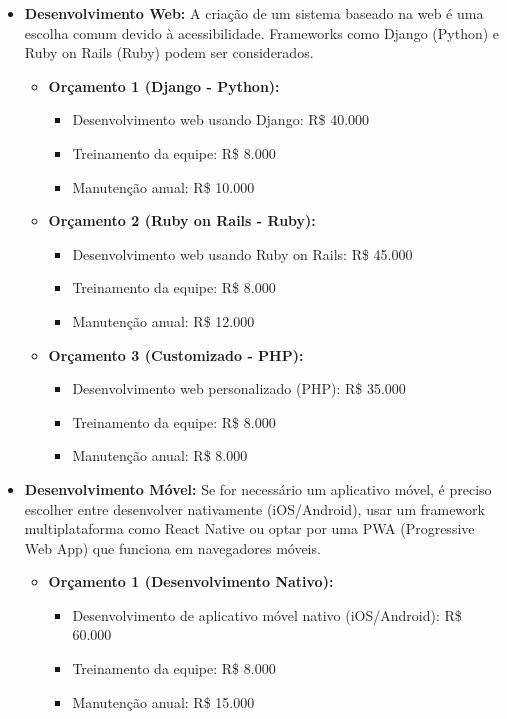 	\begin{itemize}
		\item \textbf{Desenvolvimento Web:} A criação de um sistema baseado na web é uma escolha comum devido à acessibilidade. Frameworks como Django (Python) e Ruby on Rails (Ruby) podem ser considerados.
		
		\begin{itemize}
			\item \textbf{Orçamento 1 (Django - Python):}
			\begin{itemize}
				\item Desenvolvimento web usando Django: R\$ 40.000
				\item Treinamento da equipe: R\$ 8.000
				\item Manutenção anual: R\$ 10.000
			\end{itemize}
			
			\item \textbf{Orçamento 2 (Ruby on Rails - Ruby):}
			\begin{itemize}
				\item Desenvolvimento web usando Ruby on Rails: R\$ 45.000
				\item Treinamento da equipe: R\$ 8.000
				\item Manutenção anual: R\$ 12.000
			\end{itemize}
			
			\item \textbf{Orçamento 3 (Customizado - PHP):}
			\begin{itemize}
				\item Desenvolvimento web personalizado (PHP): R\$ 35.000
				\item Treinamento da equipe: R\$ 8.000
				\item Manutenção anual: R\$ 8.000
			\end{itemize}
		\end{itemize}
		
		\item \textbf{Desenvolvimento Móvel:} Se for necessário um aplicativo móvel, é preciso escolher entre desenvolver nativamente (iOS/Android), usar um framework multiplataforma como React Native ou optar por uma PWA (Progressive Web App) que funciona em navegadores móveis.
		
		\begin{itemize}
			\item \textbf{Orçamento 1 (Desenvolvimento Nativo):}
			\begin{itemize}
				\item Desenvolvimento de aplicativo móvel nativo (iOS/Android): R\$ 60.000
				\item Treinamento da equipe: R\$ 8.000
				\item Manutenção anual: R\$ 15.000
			\end{itemize}
			

\end{itemize}
\end{itemize}
